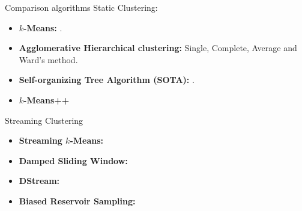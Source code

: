 \documentclass[12pt]{beamer}
\begin{document}
\begin{frame}[plain]{Comparison algorithms}
Static Clustering:
\begin{itemize}
 \item \textbf{$k$-Means:} \cite{Hartigan}.\label{clusteralgos} 
 \item \textbf{Agglomerative Hierarchical clustering:} Single, Complete, Average and Ward's method. 
\item \textbf{Self-organizing Tree Algorithm (SOTA):} \cite{Herrero}.
\item \textbf{$k$-Means++} \cite{arthur-07}
\end{itemize}
Streaming Clustering
\label{streamingalgos}
\begin{itemize}
 \item \textbf{Streaming $k$-Means:} \cite{braverman}
 \item \textbf{Damped Sliding Window:} \cite{zhu}
 \item \textbf{DStream:} \cite{dstream}
 \item \textbf{Biased Reservoir Sampling:} \cite{ccaggarwal}
\end{itemize}
\end{frame}
\end{document}
